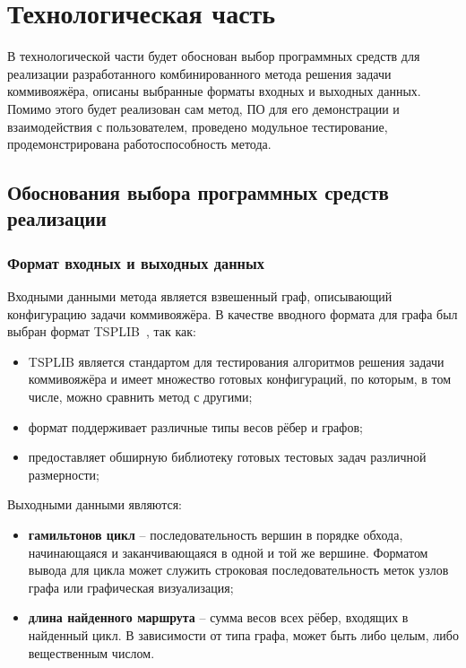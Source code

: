 \chapter{Технологическая часть}

В технологической части будет обоснован выбор программных средств для реализации разработанного комбинированного метода решения задачи коммивояжёра, описаны выбранные форматы входных и выходных данных. Помимо этого будет реализован сам метод, ПО для его демонстрации и взаимодействия с пользователем, проведено модульное тестирование, продемонстрирована работоспособность метода.

\section{Обоснования выбора программных средств реализации}

\subsection*{Формат входных и выходных данных}

Входными данными метода является взвешенный граф, описывающий конфигурацию задачи коммивояжёра. В качестве вводного формата для графа был выбран формат TSPLIB~\cite{tsplib}, так как:

\begin{itemize}
\item TSPLIB является стандартом для тестирования алгоритмов решения задачи коммивояжёра и имеет множество готовых конфигураций, по которым, в том числе, можно сравнить метод с другими;
\item формат поддерживает различные типы весов рёбер и графов;
\item предоставляет обширную библиотеку готовых тестовых задач различной размерности;
\end{itemize}
Выходными данными являются:
\begin{itemize}
	\item \textbf{гамильтонов цикл} -- последовательность вершин в порядке обхода, начинающаяся и заканчивающаяся в одной и той же вершине. Форматом вывода для цикла может служить строковая последовательность меток узлов графа или графическая визуализация;
	\item \textbf{длина найденного маршрута} -- сумма весов всех рёбер, входящих в найденный цикл. В зависимости от типа графа, может быть либо целым, либо вещественным числом.
\end{itemize}

